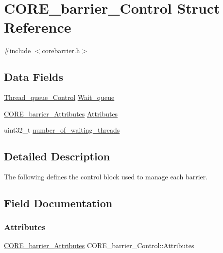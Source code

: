 \hypertarget{structCORE__barrier__Control}{}\section{C\+O\+R\+E\+\_\+barrier\+\_\+\+Control Struct Reference}
\label{structCORE__barrier__Control}


{\ttfamily \#include $<$corebarrier.\+h$>$}

\subsection*{Data Fields}
\begin{DoxyCompactItemize}
\item 
\mbox{\hyperlink{structThread__queue__Control}{Thread\+\_\+queue\+\_\+\+Control}} \mbox{\hyperlink{structCORE__barrier__Control_acee48d31f1cbe640af9b8def2246ab3a}{Wait\+\_\+queue}}
\item 
\mbox{\hyperlink{structCORE__barrier__Attributes}{C\+O\+R\+E\+\_\+barrier\+\_\+\+Attributes}} \mbox{\hyperlink{structCORE__barrier__Control_a491bc2fdd8f268cdee6ef5332a2fa75c}{Attributes}}
\item 
uint32\+\_\+t \mbox{\hyperlink{structCORE__barrier__Control_a259a5706cc66db9c750a041664d09ded}{number\+\_\+of\+\_\+waiting\+\_\+threads}}
\end{DoxyCompactItemize}


\subsection{Detailed Description}
The following defines the control block used to manage each barrier. 

\subsection{Field Documentation}
\mbox{\label{structCORE__barrier__Control_a491bc2fdd8f268cdee6ef5332a2fa75c}} 
\subsubsection{\texorpdfstring{Attributes}{Attributes}}
{\footnotesize\ttfamily \mbox{\hyperlink{structCORE__barrier__Attributes}{C\+O\+R\+E\+\_\+barrier\+\_\+\+Attributes}} C\+O\+R\+E\+\_\+barrier\+\_\+\+Control\+::\+Attributes}

